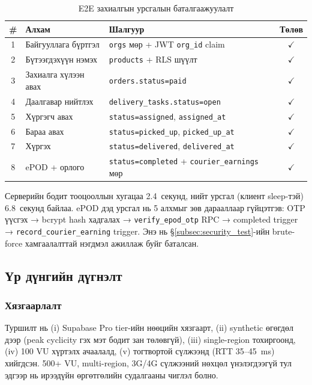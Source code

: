 \begin{table}[H]
\centering
\renewcommand{\arraystretch}{1.2}
\caption{E2E захиалгын урсгалын баталгаажуулалт}
\label{tab:e2e_flow}
\footnotesize
\begin{tabular}{|c|p{4.5cm}|p{5.5cm}|c|}
\hline
\textbf{\#} & \textbf{Алхам} & \textbf{Шалгуур} & \textbf{Төлөв} \\
\hline
1 & Байгууллага бүртгэл & \texttt{orgs} мөр + JWT \texttt{org\_id} claim & $\checkmark$ \\
\hline
2 & Бүтээгдэхүүн нэмэх & \texttt{products} + RLS шүүлт & $\checkmark$ \\
\hline
3 & Захиалга хүлээн авах & \texttt{orders.status=paid} & $\checkmark$ \\
\hline
4 & Даалгавар нийтлэх & \texttt{delivery\_tasks.status=open} & $\checkmark$ \\
\hline
5 & Хүргэгч авах & \texttt{status=assigned}, \texttt{assigned\_at} & $\checkmark$ \\
\hline
6 & Бараа авах & \texttt{status=picked\_up}, \texttt{picked\_up\_at} & $\checkmark$ \\
\hline
7 & Хүргэх & \texttt{status=delivered}, \texttt{delivered\_at} & $\checkmark$ \\
\hline
8 & ePOD + орлого & \texttt{status=completed} + \texttt{courier\_earnings} мөр & $\checkmark$ \\
\hline
\end{tabular}
\end{table}

Серверийн бодит тооцооллын хугацаа 2.4~секунд, нийт урсгал (клиент sleep-тэй) 6.8~секунд байлаа. ePOD дэд урсгал нь 5 алхмыг зөв дарааллаар гүйцэтгэв: OTP үүсгэх → bcrypt hash хадгалах → \texttt{verify\_epod\_otp} RPC → completed trigger → \texttt{record\_courier\_earning} trigger. Энэ нь \S\ref{subsec:security_test}-ийн brute-force хамгаалалттай нэгдмэл ажиллаж буйг баталсан.

\subsection{Үр дүнгийн дүгнэлт}
\label{subsec:results_summary}

\subsubsection{Хязгаарлалт}

Туршилт нь (i) Supabase Pro tier-ийн нөөцийн хязгаарт, (ii) synthetic өгөгдөл дээр (peak cyclicity гэх мэт бодит зан төлөвгүй), (iii) single-region тохиргоонд, (iv) 100 VU хүртэлх ачаалалд, (v) тогтвортой сүлжээнд (RTT 35--45~ms) хийгдсэн. 500+ VU, multi-region, 3G/4G сүлжээний нөхцөл үнэлэгдээгүй тул эдгээр нь ирээдүйн өргөтгөлийн судалгааны чиглэл болно.

